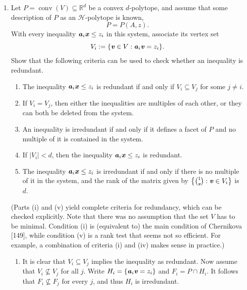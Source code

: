 \documentclass{article}
\begin{document}
\begin{enumerate}
\begin{solution}
\begin{enumerate}[label=(\roman*)]
\end{enumerate}
\end{solution}

\item Let $P = \operatorname{conv}(V) \subseteq \mathbb{R}^d$ be a convex $d$-polytope, and assume that some description of $P$ as an $\mathcal{H}$-polytope is known, \[ P = P(A,z). \] With every inequality $\textbf{\textit{a}}_i \textbf{\textit{x}} \le z_i$ in this system, associate its vertex set \[ V_i := \{\textbf{\textit{v}} \in V : \textbf{\textit{a}}_i \textbf{\textit{v}} = z_i\}. \] Show that the following criteria can be used to check whether an inequality is redundant. 

\begin{enumerate}[label=(\roman*)]
\item The inequality $\textbf{\textit{a}}_i \textbf{\textit{x}} \le z_i$ is redundant if and only if $V_i \subseteq V_j$ for some $j \neq i$. 

\item If $V_i = V_j$, then either the inequalities are multiples of each other, or they can both be deleted from the system. 

\item An inequality is irredundant if and only if it defines a facet of $P$ and no multiple of it is contained in the system. 

\item If $\lvert V_i\rvert < d$, then the inequality $\textbf{\textit{a}}_i \textbf{\textit{x}} \le z_i$ is redundant. 

\item The inequality $\textbf{\textit{a}}_i \textbf{\textit{x}} \le z_i$ is irredundant if and only if there is no multiple of it in the system, and the rank of the matrix given by $\left\{\binom{1}{\textbf{\textit{v}}} : \textbf{\textit{v}} \in V_i\right\}$ is $d$. 
\end{enumerate} 

(Parts (i) and (v) yield complete criteria for redundancy, which can be checked explicitly. Note that there was no assumption that the set $V$ has to be minimal. Condition (i) is (equivalent to) the main condition of Chernikova [149], while condition (v) is a rank test that seems not so efficient. For example, a combination of criteria (i) and (iv) makes sense in practice.) 

\begin{solution}
\begin{enumerate}[label=(\roman*)]
    \item It is clear that $V_i \subseteq V_j$ implies the inequality as redundant. Now assume that $V_i \nsubseteq V_j$ for all $j$. Write $H_i = \{\textbf{\textit{a}}_i\textbf{\textit{v}} = z_i\}$ and $F_i = P \cap H_i$. It follows that $F_i \nsubseteq F_j$ for every $j$, and thus $H_i$ is irredundant.


\end{enumerate}
\end{solution}
\end{enumerate}
\end{document}
